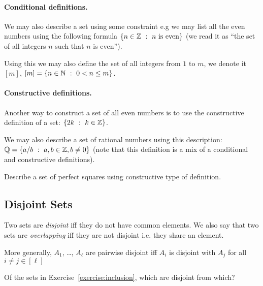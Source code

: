 \paragraph{Conditional definitions.}
We may also describe a set using some constraint e.g we may list all the even
numbers using the following formula $\set[n \text{ is even}]{n \in \Z}$
(we read it as ``the set of all integers $n$ such that $n$ is even'').

Using this we may also define the set of all integers from $1$ to $m$, we
denote it $[m]$, $[m] = \set[0 < n \le m]{n \in \N}$.

\paragraph{Constructive definitions.} Another way to construct a set of all
even numbers is to use the constructive definition of a set:
$\set[k \in \Z]{2k}$.

We may also describe a set of rational numbers using this description:
$\Q = \set[a, b \in \Z, b \neq 0]{a / b}$ (note that this definition is a mix of
a conditional and constructive definitions).

\begin{exercise}
  Describe a set of perfect squares using constructive type of definition.
\end{exercise}

\subsection{Disjoint Sets}
Two sets are \textit{disjoint} iff they do not have common elements. We also
say that two sets are \textit{overlapping} iff they are not disjoint i.e. they
share an element.

More generally, $A_1$, \dots, $A_\ell$ are pairwise disjoint iff $A_i$ is
disjoint with $A_j$ for all $i \neq j \in [\ell]$

\begin{exercise}
  Of the sets in Exercise~\ref{exercise:inclusion}, which are disjoint from
  which?
\end{exercise}



